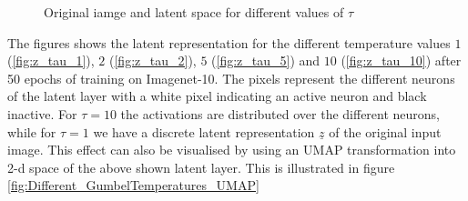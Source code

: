 \documentclass[12pt,DIV14,BCOR12mm,a4paper,footexclude,headinclude,halfparskip-,twoside,openright,cleardoubleempty,idxtotoc,bibtotoc,listtotoc]{scrreprt} %
\numberwithin{equation}{chapter}
\begin{document}
	\begin{figure}[htb!]
	\centering
	\qquad
	\qquad
	\qquad
	\qquad
	\qquad
	\caption{Original iamge and latent space for different values of $\tau$}
	\label{fig:Different_GumbelTemperatures}
\end{figure}
The figures shows the latent representation for the different temperature values $1$ (\ref{fig:z_tau_1}), $2$ (\ref{fig:z_tau_2}), $5$ (\ref{fig:z_tau_5}) and $10$ (\ref{fig:z_tau_10}) after 50 epochs of training on Imagenet-10. The pixels represent the different neurons of the latent layer with a white pixel indicating an active neuron and black inactive. For $\tau = 10$ the activations are distributed over the different neurons, while for $\tau = 1$ we have a discrete latent representation $\underline{z}$ of the original input image. This effect can also be visualised by using an UMAP transformation into 2-d space of the above shown latent layer. This is illustrated in figure \ref{fig:Different_GumbelTemperatures_UMAP}
\end{document}
